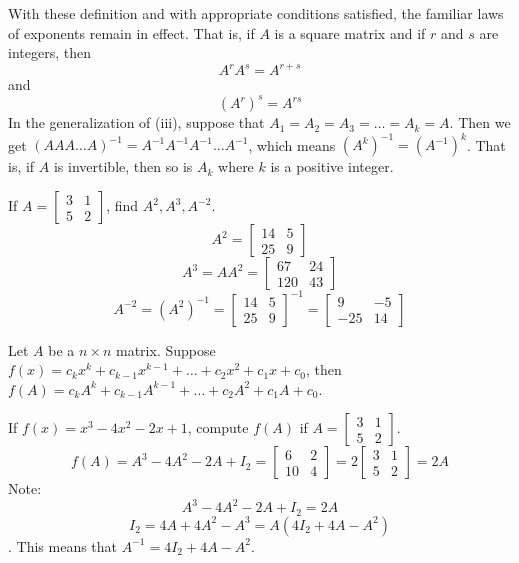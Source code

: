 \documentclass[12pt]{article}
\begin{document}
With these definition and with appropriate conditions satisfied, the familiar laws of exponents remain in effect. That is, if $A$ is a square matrix and if $r$ and $s$ are integers, then $$ A^rA^s = A^{r+s} $$ and $$ (A^r)^s = A^{rs} $$
In the generalization of (iii), suppose that $A_1 = A_2 = A_3 = \dots = A_k = A$. Then we get $(AAA\dots A)^{-1} = A^{-1}A^{-1}A^{-1}\dots A^{-1} $, which means $(A^k)^{-1} = (A^{-1})^k$. That is, if $A$ is invertible, then so is $A_k$ where $k$ is a positive integer. 
\begin{example} If $A = \begin{bmatrix} 3 &1 \\ 5 & 2 \end{bmatrix} $, find $A^2, A^3, A^{-2}$. \newline
$$A^2 = \begin{bmatrix} 14 & 5 \\ 25 & 9 \end{bmatrix} $$
$$ A^3 = AA^2 = \begin{bmatrix} 67 & 24 \\ 120 & 43 \end{bmatrix} $$ 
$$ A^{-2} = (A^2)^{-1} = \begin{bmatrix} 14 & 5 \\ 25 & 9 \end{bmatrix}^{-1} = \begin{bmatrix} 9 & -5 \\ -25 & 14 \end{bmatrix} $$ \end{example}
Let $A$ be a $n \times n$ matrix. Suppose $f(x) = c_kx^k + c_{k - 1}x^{k - 1} + \dots + c_2x^2 + c_1x + c_0$, then $f(A) = c_kA^k + c_{k - 1}A^{k - 1} + \dots + c_2A^2 + c_1A + c_0$. 
\begin{example} 
If $f(x) = x^3 - 4x^2 - 2x + 1$, compute $f(A)$ if $A = \begin{bmatrix} 3 & 1 \\ 5 & 2 \end{bmatrix} $. \newline
$$ f(A) = A^3 - 4A^2 - 2A + I_2 = \begin{bmatrix} 6 & 2 \\ 10 & 4 \end{bmatrix}  = 2 \begin{bmatrix} 3 & 1 \\ 5 & 2 \end{bmatrix} = 2A $$ Note: $$ A^3 - 4A^2 - 2A + I_2 = 2A$$ $$ I_2 = 4A + 4A^2 - A^3 = A(4I_2 + 4A - A^2) $$. This means that $ A^{-1} = 4I_2 + 4A - A^2 $. \end{example} 
\end{document}
